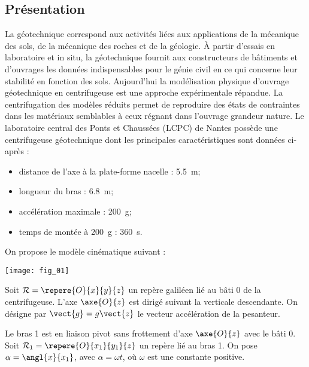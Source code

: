 \def\columnseprulecolor{\color{ocre}}
\setlength{\columnseprule}{0.4pt} 


\setcounter{exo}{0}





\ifprof
\else
\begin{multicols}{2}

\subsection*{Présentation}
La géotechnique correspond aux activités liées aux applications de la mécanique des sols, de la mécanique des roches et de la
géologie. À partir d'essais en laboratoire et in situ, la géotechnique fournit aux constructeurs de bâtiments et d'ouvrages les
données indispensables pour le génie civil en ce qui concerne leur stabilité en fonction des sols. Aujourd'hui la modélisation
physique d'ouvrage géotechnique en centrifugeuse est une approche expérimentale répandue. La centrifugation des modèles
réduits permet de reproduire des états de contraintes dans les matériaux semblables à ceux régnant dans l'ouvrage grandeur
nature. Le laboratoire central des Ponts et Chaussées (LCPC) de Nantes possède une centrifugeuse géotechnique dont les
principales caractéristiques sont données ci-après :
\begin{itemize}
\item distance de l'axe à la plate-forme nacelle : \SI{5,5}{m};
\item longueur du bras : \SI{6,8}{m};
\item accélération maximale : \SI{200}{g};
\item temps de montée à \SI{200}{g} : \SI{360}{s}.
\end{itemize}

On propose le modèle cinématique suivant :
\begin{center}
\texttt{[image: fig\_01]}
\end{center}

Soit $\mathcal{R}=\repere{O}{x}{y}{z}$ un repère galiléen lié au bâti 0 de la centrifugeuse. L'axe $\axe{O}{z}$ est dirigé suivant la verticale descendante. 
On désigne par $\vect{g}=g\vect{z}$ le vecteur accélération de la pesanteur.

Le bras 1 est en liaison pivot sans frottement d’axe $\axe{O}{z}$ avec le bâti 0. Soit $\mathcal{R}_1=\repere{O}{x_1}{y_1}{z}$ un repère lié au bras 1. On pose $\alpha=\angl{x}{x_1}$, avec $\alpha=\omega t$, où $\omega$ est une constante positive. 


\end{multicols}
